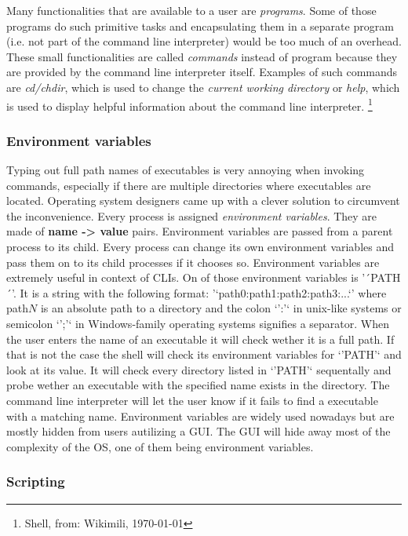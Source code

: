 Many functionalities that are available to a user are \textit{programs}. Some of those programs do such primitive
tasks and encapsulating them in a separate program (i.e. not part of the command line interpreter) would
be too much of an overhead. These small functionalities are called \textit{commands} instead of program because
they are provided by the command line interpreter itself. Examples of such commands are \textit{cd/chdir}, which
is used to change the \textit{current working directory} or \textit{help}, which is used to display helpful information
about the command line interpreter. \footnote{Shell, from: Wikimili, \today }

\subsubsection{Environment variables}

Typing out full path names of executables is very annoying when invoking commands, especially if there
are multiple directories where executables are located. Operating system designers came up with a clever
solution to circumvent the inconvenience. Every process is assigned \textit{environment variables}. They are
made of \textbf{name -> value} pairs. Environment variables are passed from a parent process to its child.
Every process can change its own environment variables and pass them on to its child processes if it
chooses so. Environment variables are extremely useful in context of CLIs. On of those environment
variables is '´PATH´'. It is a string with the following format: '`path0:path1:path2:path3:...`' where
path$N$ is an absolute path to a directory and the colon `':'` in unix-like systems or semicolon `';'`
in Windows-family operating systems signifies a separator. When the user enters the name of an 
executable it will check wether it is a full path. If that is not the case the shell will check its
environment variables for `'PATH'` and look at its value. It will check every directory listed in
`'PATH'` sequentally and probe wether an executable with the specified name exists in the directory.
The command line interpreter will let the user know if it fails to find a executable with a matching
name. Environment variables are widely used nowadays but are mostly hidden from users autilizing a GUI.
The GUI will hide away most of the complexity of the OS, one of them being environment variables.


\subsubsection{Scripting}

